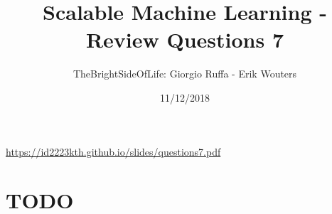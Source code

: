 \documentclass[a4paper]{article}
\title{Scalable Machine Learning - Review Questions 7}
\author{TheBrightSideOfLife: Giorgio Ruffa - Erik Wouters}
\date{11/12/2018}
\begin{document}
\maketitle

\url{https://id2223kth.github.io/slides/questions7.pdf}

\section{TODO}


% 
\end{document}

